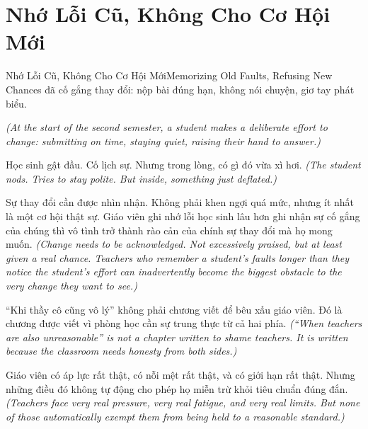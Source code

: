 \section{Nhớ Lỗi Cũ, Không Cho Cơ Hội Mới}
\begin{truyen}{Nhớ Lỗi Cũ, Không Cho Cơ Hội Mới}{Memorizing Old Faults, Refusing New Chances}
 đã cố gắng thay đổi: nộp bài đúng hạn, không nói chuyện, giơ tay phát biểu.

\textit{(At the start of the second semester, a student makes a deliberate effort to change: submitting on time, staying quiet, raising their hand to answer.)}


Học sinh gật đầu. Cố lịch sự. Nhưng trong lòng, có gì đó vừa xì hơi.
\textit{(The student nods. Tries to stay polite. But inside, something just deflated.)}

\begin{baihoc}
Sự thay đổi cần được nhìn nhận. Không phải khen ngợi quá mức, nhưng ít nhất là một cơ hội thật sự. Giáo viên ghi nhớ lỗi học sinh lâu hơn ghi nhận sự cố gắng của chúng thì vô tình trở thành rào cản của chính sự thay đổi mà họ mong muốn.
\textit{(Change needs to be acknowledged. Not excessively praised, but at least given a real chance. Teachers who remember a student's faults longer than they notice the student's effort can inadvertently become the biggest obstacle to the very change they want to see.)}
\end{baihoc}
\end{truyen}

\begin{baihoc}
``Khi thầy cô cũng vô lý'' không phải chương viết để bêu xấu giáo viên. Đó là chương được viết vì phòng học cần sự trung thực từ cả hai phía.
\textit{(``When teachers are also unreasonable'' is not a chapter written to shame teachers. It is written because the classroom needs honesty from both sides.)}

Giáo viên có áp lực rất thật, có nỗi mệt rất thật, và có giới hạn rất thật. Nhưng những điều đó không tự động cho phép họ miễn trừ khỏi tiêu chuẩn đúng đắn.
\textit{(Teachers face very real pressure, very real fatigue, and very real limits. But none of those automatically exempt them from being held to a reasonable standard.)}
\end{baihoc}

